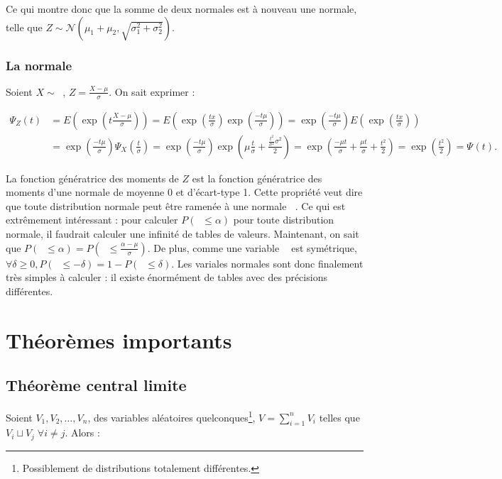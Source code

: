 \documentclass{article}
\DeclareMathOperator{\Nms}{\mathcal N(\mu, \sigma)}
\DeclareMathOperator{\Nzo}{\mathcal N(0, 1)}
\begin{document}
			Ce qui montre donc que la somme de deux normales est à nouveau une normale, telle que $Z \sim \mathcal N(\mu_1+\mu_2, \sqrt {\sigma_1^2 + \sigma_2^2})$.

		\subsubsection{La normale $\Nzo$}
			Soient $X \sim \Nms$, $Z = \frac {X-\mu}\sigma$. On sait exprimer :

			\begin{align*}
				\Psi_Z(t) &= E\left(\exp\left(t\frac {X-\mu}\sigma\right)\right) = E\left(\exp\left(\frac {tx}\sigma\right)\exp\left(\frac {-t\mu}\sigma\right)\right) =
				\exp\left(\frac {-t\mu}\sigma\right)E\left(\exp\left(\frac {tx}\sigma\right)\right) \\
				          &= \exp\left(\frac {-t\mu}\sigma\right)\Psi_X\left(\frac t\sigma\right) =
				\exp\left(\frac {-t\mu}\sigma\right)\exp\left(\mu \frac t\sigma + \frac {\frac {t^2}{\sigma^2}\sigma^2}2\right) =
			    \exp\left(\frac {-\mu t}\sigma + \frac {\mu t}\sigma + \frac {t^2}2 \right) = \exp\left(\frac {t^2}2\right) = \Psi_{\Nzo}(t).
			\end{align*}

			La fonction génératrice des moments de $Z$ est la fonction génératrice des moments d'une normale de moyenne 0 et d'écart-type 1. Cette propriété veut dire
			que toute distribution normale peut être ramenée à une normale $\Nzo$. Ce qui est extrêmement intéressant : pour calculer $P(\Nms \leq \alpha)$ pour toute
			distribution normale, il faudrait calculer une infinité de tables de valeurs. Maintenant, on sait que $P(\Nms \leq \alpha) = P(\Nzo \leq \frac {\alpha - \mu}\sigma)$.
			De plus, comme une variable $\Nzo$ est symétrique, $\forall \delta \geq 0, P(\Nzo \leq -\delta) = 1 - P(\Nzo \leq \delta)$. Les variales normales sont
			donc finalement très simples à calculer : il existe énormément de tables avec des précisions différentes.

\section{Théorèmes importants}
	\subsection{Théorème central limite}
		Soient $V_1, V_2, \ldots, V_n$, des variables aléatoires quelconques\footnote{Possiblement de distributions totalement différentes.}, $V = \sum_{i=1}^nV_i$ telles que
		$V_i \sqcup V_j \; \forall i \neq j$. Alors :
\end{document}
